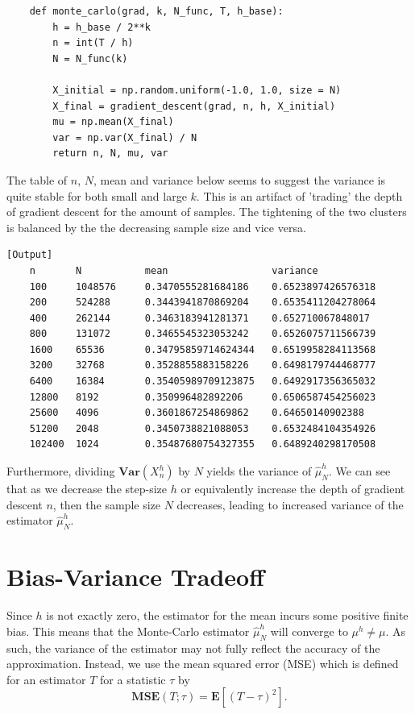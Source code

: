 \documentclass{article}
\begin{document}
\begin{verbatim}
    def monte_carlo(grad, k, N_func, T, h_base):
        h = h_base / 2**k
        n = int(T / h)
        N = N_func(k)
    
        X_initial = np.random.uniform(-1.0, 1.0, size = N)
        X_final = gradient_descent(grad, n, h, X_initial)
        mu = np.mean(X_final)
        var = np.var(X_final) / N
        return n, N, mu, var
\end{verbatim}

The table of \(n\), \(N\), mean and variance below seems to suggest the variance is quite stable for both small and large \(k\). This is an artifact of 'trading' the depth of gradient descent for the amount of samples. The tightening of the two clusters is balanced by the the decreasing sample size and vice versa.

\begin{verbatim}[Output]
    n       N           mean                  variance
    100     1048576     0.3470555281684186    0.6523897426576318
    200     524288      0.3443941870869204    0.6535411204278064
    400     262144      0.3463183941281371    0.652710067848017
    800     131072      0.3465545323053242    0.6526075711566739
    1600    65536       0.34795859714624344   0.6519958284113568
    3200    32768       0.3528855883158226    0.6498179744468777
    6400    16384       0.35405989709123875   0.6492917356365032
    12800   8192        0.350996482892206     0.6506587454256023
    25600   4096        0.3601867254869862    0.64650140902388
    51200   2048        0.3450738821088053    0.6532484104354926
    102400  1024        0.35487680754327355   0.6489240298170508
\end{verbatim}

Furthermore, dividing \(\mathbf{Var}(X_n^h)\) by \(N\) yields the variance of \(\hat\mu^h_N\). We can see that as we decrease the step-size \(h\) or equivalently increase the depth of gradient descent \(n\), then the sample size \(N\) decreases, leading to increased variance of the estimator \(\hat\mu^h_N\).

\section{Bias-Variance Tradeoff}

Since \(h\) is not exactly zero, the estimator for the mean incurs some positive finite bias. This means that the Monte-Carlo estimator \(\hat\mu^h_N\) will converge to \(\mu^h \neq \mu\). As such, the variance of the estimator may not fully reflect the accuracy of the approximation. Instead, we use the mean squared error (MSE) which is defined for an estimator \(T\) for a statistic \(\tau\) by
\[ \mathbf{MSE}(T; \tau) = \mathbf{E}[(T - \tau)^2]. \]
\end{document}
